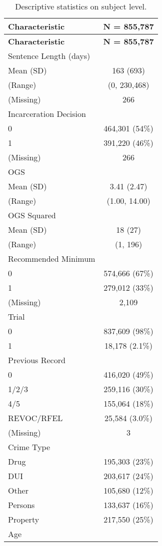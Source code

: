 \documentclass[
  letterpaper,
  DIV=11,
  numbers=noendperiod]{scrartcl}
\begin{document}
\hypertarget{tbl-descriptives}{}
\begin{longtable}[]{@{}lc@{}}
\caption{\label{tbl-descriptives}Descriptive statistics on subject
level.}\tabularnewline
\toprule\noalign{}
\textbf{Characteristic} & \textbf{N = 855,787} \\
\midrule\noalign{}
\endfirsthead
\toprule\noalign{}
\textbf{Characteristic} & \textbf{N = 855,787} \\
\midrule\noalign{}
\endhead
\bottomrule\noalign{}
\endlastfoot
Sentence Length (days) & \\
Mean (SD) & 163 (693) \\
(Range) & (0, 230,468) \\
(Missing) & 266 \\
Incarceration Decision & \\
0 & 464,301 (54\%) \\
1 & 391,220 (46\%) \\
(Missing) & 266 \\
OGS & \\
Mean (SD) & 3.41 (2.47) \\
(Range) & (1.00, 14.00) \\
OGS Squared & \\
Mean (SD) & 18 (27) \\
(Range) & (1, 196) \\
Recommended Minimum & \\
0 & 574,666 (67\%) \\
1 & 279,012 (33\%) \\
(Missing) & 2,109 \\
Trial & \\
0 & 837,609 (98\%) \\
1 & 18,178 (2.1\%) \\
Previous Record & \\
0 & 416,020 (49\%) \\
1/2/3 & 259,116 (30\%) \\
4/5 & 155,064 (18\%) \\
REVOC/RFEL & 25,584 (3.0\%) \\
(Missing) & 3 \\
Crime Type & \\
Drug & 195,303 (23\%) \\
DUI & 203,617 (24\%) \\
Other & 105,680 (12\%) \\
Persons & 133,637 (16\%) \\
Property & 217,550 (25\%) \\
Age & \\

\end{longtable}
\end{document}
